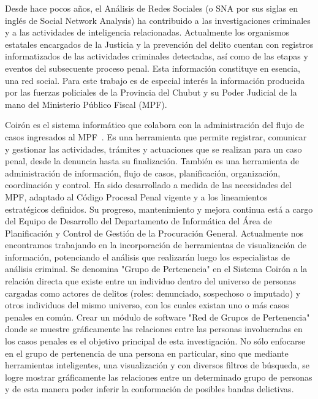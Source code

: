 \vspace{-5pt}
Desde hace pocos años, el Análisis de Redes Sociales (o SNA por sus siglas en inglés de Social Network Analysis) ha contribuido a las investigaciones criminales y a las actividades de inteligencia relacionadas.
Actualmente los organismos estatales encargados de la Justicia y la prevención del delito cuentan con registros informatizados de las actividades criminales detectadas, así como de las etapas y eventos del subsecuente proceso penal. 
Esta información constituye en esencia, una red social. 
Para este trabajo es de especial interés la información producida por las fuerzas policiales de la Provincia del Chubut y su Poder Judicial de la mano del Ministerio Público Fiscal (MPF). 

Coirón es el sistema informático que colabora con la administración del flujo de casos ingresados al MPF~\cite{MPFChubutPaginaWeb}. Es una herramienta que permite registrar, comunicar y gestionar las actividades, trámites y actuaciones que se realizan para un caso penal, desde la denuncia hasta su finalización. También es una herramienta de administración de información, flujo de casos, planificación, organización, coordinación y control.
Ha sido desarrollado a medida de las necesidades del MPF, adaptado al Código Procesal Penal vigente y a los lineamientos estratégicos definidos. Su progreso, mantenimiento y mejora continua está a cargo del Equipo de Desarrollo del Departamento de Informática del Área de Planificación y Control de Gestión de la Procuración General.
Actualmente nos encontramos trabajando en la incorporación de herramientas de visualización de información, potenciando el análisis que realizarán luego los especialistas de análisis criminal.
Se denomina "Grupo de Pertenencia" en el Sistema Coirón a la relación directa que existe entre un individuo dentro del universo de personas cargadas como actores de delitos (roles: denunciado, sospechoso o imputado) y otros individuos del mismo universo, con los cuales existan uno o más casos penales en común.
Crear un módulo de software "Red de Grupos de Pertenencia" donde se muestre gráficamente las relaciones entre las personas involucradas en los casos penales es el objetivo principal de esta investigación. No sólo enfocarse en el grupo de pertenencia de una persona en particular, sino que mediante herramientas inteligentes, una visualización y con diversos filtros de búsqueda, se logre mostrar gráficamente las relaciones entre un determinado grupo de personas y de esta manera poder inferir la conformación de posibles bandas delictivas.
